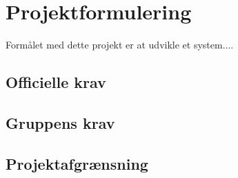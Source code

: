 \chapter{Projektformulering}\label{kapitel_Projektformulering}
Formålet med dette projekt er at udvikle et system....


\section{Officielle krav}



\section{Gruppens krav}


\section{Projektafgrænsning}


